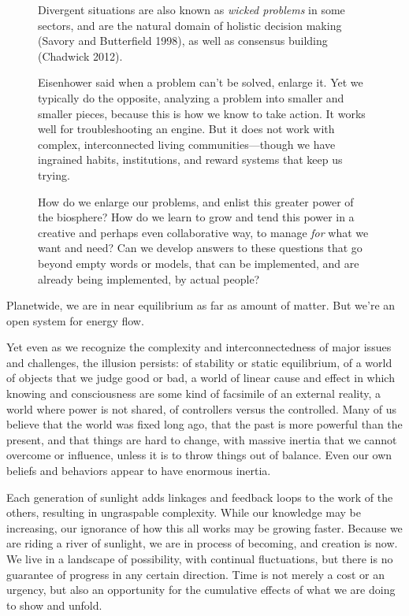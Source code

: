 \documentclass[11pt,letterpaper,twoside,onecolumn]{memoir}
\begin{document}
\begin{figure}
\begin{tcolorbox}
Divergent situations are also known as \textit{wicked problems} in some sectors, and are the natural domain of holistic decision making (Savory and Butterfield 1998), as well as consensus building (Chadwick 2012).

Eisenhower said when a problem can't be solved, enlarge it. Yet we typically do the opposite, analyzing a problem into smaller and smaller pieces, because this is how we know to take action. It works well for troubleshooting an engine. But it does not work with complex, interconnected living communities---though we have ingrained habits, institutions, and reward systems that keep us trying.

How do we enlarge our problems, and enlist this greater power of the biosphere? How do we learn to grow and tend this power in a creative and perhaps even collaborative way, to manage \textit{for} what we want and need? Can we develop answers to these questions that go beyond empty words or models, that can be implemented, and are already being implemented, by actual people?

\end{tcolorbox}
\end{figure}

Planetwide, we are in near equilibrium as far as amount of matter. But we're an open system for energy flow.

Yet even as we recognize the complexity and interconnectedness of major issues and challenges, the illusion persists: of stability or static equilibrium, of a world of objects that we judge good or bad, a world of linear cause and effect in which knowing and consciousness are some kind of facsimile of an external reality, a world where power is not shared, of controllers versus the controlled. Many of us believe that the world was fixed long ago, that the past is more powerful than the present, and that things are hard to change, with massive inertia that we cannot overcome or influence, unless it is to throw things out of balance. Even our own beliefs and behaviors appear to have enormous inertia.

Each generation of sunlight adds linkages and feedback loops to the work of the others, resulting in ungraspable complexity. While our knowledge may be increasing, our ignorance of how this all works may be growing faster. Because we are riding a river of sunlight, we are in process of becoming, and creation is now.  \label{chance} We live in a landscape of possibility, with continual fluctuations, but there is no guarantee of progress in any certain direction. Time is not merely a cost or an urgency, but also an opportunity for the cumulative effects of what we are doing to show and unfold.
\end{document}
